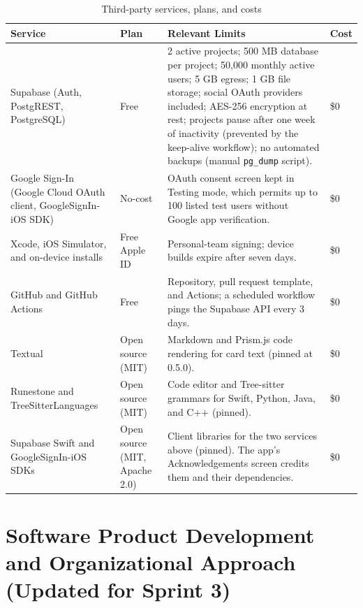 \documentclass[12pt,letterpaper]{article}
\begin{document}
\begin{table}[H]
\centering
\caption{Third-party services, plans, and costs}
\label{tab:services}
\begin{tabularx}{\textwidth}{@{}L{3.2cm} L{2.4cm} Y l@{}}
\toprule
\textbf{Service} & \textbf{Plan} & \textbf{Relevant Limits} & \textbf{Cost} \\
\midrule
Supabase (Auth, PostgREST, PostgreSQL) & Free & 2 active projects; 500 MB database per project; 50,000 monthly active users; 5 GB egress; 1 GB file storage; social OAuth providers included; AES-256 encryption at rest; projects pause after one week of inactivity (prevented by the keep-alive workflow); no automated backups (manual \texttt{pg\_dump} script). & \$0 \\
Google Sign-In (Google Cloud OAuth client, GoogleSignIn-iOS SDK) & No-cost & OAuth consent screen kept in Testing mode, which permits up to 100 listed test users without Google app verification. & \$0 \\
Xcode, iOS Simulator, and on-device installs & Free Apple ID & Personal-team signing; device builds expire after seven days. & \$0 \\
GitHub and GitHub Actions & Free & Repository, pull request template, and Actions; a scheduled workflow pings the Supabase API every 3 days. & \$0 \\
Textual & Open source (MIT) & Markdown and Prism.js code rendering for card text (pinned at 0.5.0). & \$0 \\
Runestone and TreeSitterLanguages & Open source (MIT) & Code editor and Tree-sitter grammars for Swift, Python, Java, and C++ (pinned). & \$0 \\
Supabase Swift and GoogleSignIn-iOS SDKs & Open source (MIT, Apache 2.0) & Client libraries for the two services above (pinned). The app's Acknowledgements screen credits them and their dependencies. & \$0 \\
\bottomrule
\end{tabularx}
\end{table}

\section{Software Product Development and Organizational Approach (Updated for Sprint 3)}\label{sec:process}
\end{document}
